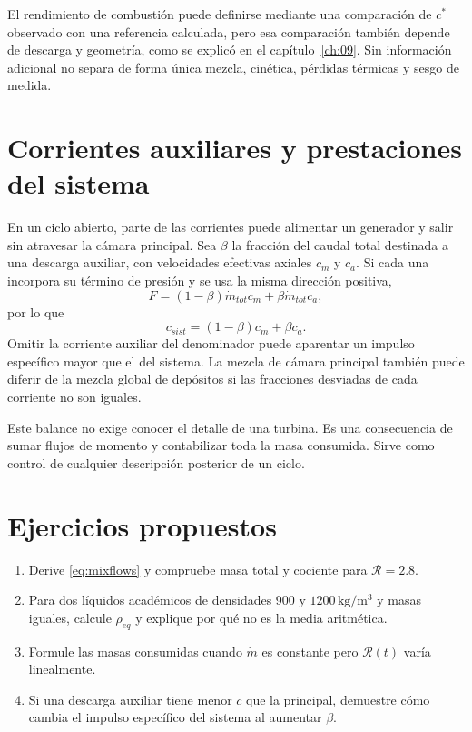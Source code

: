 El rendimiento de combustión puede definirse mediante una comparación de $c^*$ observado con una referencia calculada, pero esa comparación también depende de descarga y geometría, como se explicó en el capítulo~\ref{ch:09}. Sin información adicional no separa de forma única mezcla, cinética, pérdidas térmicas y sesgo de medida.
\section{Corrientes auxiliares y prestaciones del sistema}
En un ciclo abierto, parte de las corrientes puede alimentar un generador y salir sin atravesar la cámara principal. Sea $\beta$ la fracción del caudal total destinada a una descarga auxiliar, con velocidades efectivas axiales $c_m$ y $c_a$. Si cada una incorpora su término de presión y se usa la misma dirección positiva,
\[
 F=(1-\beta)\dot m_{tot}c_m+\beta\dot m_{tot}c_a,
\]
por lo que
\begin{equation}
 c_{sist}=(1-\beta)c_m+\beta c_a.
\end{equation}
Omitir la corriente auxiliar del denominador puede aparentar un impulso específico mayor que el del sistema. La mezcla de cámara principal también puede diferir de la mezcla global de depósitos si las fracciones desviadas de cada corriente no son iguales.

Este balance no exige conocer el detalle de una turbina. Es una consecuencia de sumar flujos de momento y contabilizar toda la masa consumida. Sirve como control de cualquier descripción posterior de un ciclo.
\section{Ejercicios propuestos}
\begin{enumerate}
\item Derive \eqref{eq:mixflows} y compruebe masa total y cociente para $\mathcal R=2.8$.
\item Para dos líquidos académicos de densidades 900 y $1200\,\mathrm{kg/m^3}$ y masas iguales, calcule $\rho_{eq}$ y explique por qué no es la media aritmética.
\item Formule las masas consumidas cuando $\dot m$ es constante pero $\mathcal R(t)$ varía linealmente.
\item Si una descarga auxiliar tiene menor $c$ que la principal, demuestre cómo cambia el impulso específico del sistema al aumentar $\beta$.
\end{enumerate}
